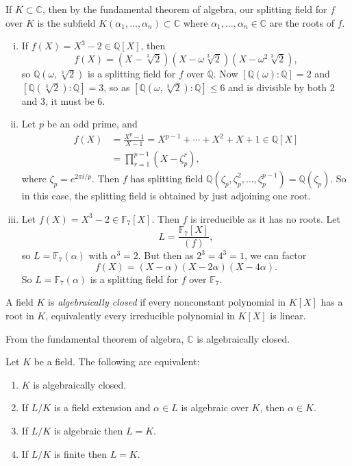 \documentclass[12pt]{article}
\begin{document}
\begin{exbox}
	If $K \subset \mathbb{C}$, then by the fundamental theorem of algebra, our splitting field for $f$ over $K$ is the subfield $K(\alpha_1, \ldots, \alpha_n) \subset \mathbb{C}$ where $\alpha_1, \ldots, \alpha_n \in \mathbb{C}$ are the roots of $f$.
	\begin{enumerate}[(i)]
		\item If $f(X) = X^3 - 2 \in \mathbb{Q}[X]$, then
			\[
				f(X) = (X - \sqrt[3]2)(X-\omega\sqrt[3]2)(X-\omega^2\sqrt[3]2),
			\]
			so $\mathbb{Q}(\omega, \sqrt[3]2)$ is a splitting field for $f$ over $\mathbb{Q}$. Now $[\mathbb{Q}(\omega): \mathbb{Q}] = 2$ and $[\mathbb{Q}(\sqrt[3]2): \mathbb{Q}] = 3$, so as $[\mathbb{Q}(\omega, \sqrt[3]2) : \mathbb{Q}] \leq 6$ and is divisible by both 2 and 3, it must be $6$.
		\item Let $p$ be an odd prime, and
			\begin{align*}
				f(X) &= \frac{X^{p}-1}{X-1} = X^{p-1} + \cdots + X^2 + X + 1 \in \mathbb{Q}[X]\\
				     &= \prod_{r = 1}^{p-1}(X - \zeta_p^r),
			\end{align*}
			where $\zeta_p = e^{2\pi i/p}$. Then $f$ has splitting field $\mathbb{Q}(\zeta_p, \zeta_p^2, \ldots, \zeta_p^{p-1}) = \mathbb{Q}(\zeta_p)$. So in this case, the splitting field is obtained by just adjoining one root.
		\item Let $f(X) = X^3 - 2 \in \mathbb{F}_7[X]$. Then $f$ is irreducible as it has no roots. Let
			\[
				L = \frac{\mathbb{F}_7[X]}{(f)},
			\]
			so $L = \mathbb{F}_7(\alpha)$ with $\alpha^3 = 2$. But then as $2^3 = 4^3 = 1$, we can factor
			\[
			f(X) = (X-\alpha)(X-2\alpha)(X-4\alpha).
			\]
			So $L = \mathbb{F}_7(\alpha)$ is a splitting field for $f$ over $\mathbb{F}_7$.
	\end{enumerate}
\end{exbox}


\begin{definition}
	A field $K$ is \emph{algebraically closed} if every nonconstant polynomial in $K[X]$ has a root in $K$, equivalently every irreducible polynomial in $K[X]$ is linear.
\end{definition}

From the fundamental theorem of algebra, $\mathbb{C}$ is algebraically closed.

\begin{lemma}
	Let $K$ be a field. The following are equivalent:
	\begin{enumerate}[\normalfont(i)]
		\item $K$ is algebraically closed.
		\item If $L/K$ is a field extension and $\alpha \in L$ is algebraic over $K$, then $\alpha \in K$.
		\item If $L/K$ is algebraic then $L = K$.
		\item If $L/K$ is finite then $L = K$.
	\end{enumerate}
\end{lemma}
\end{document}
